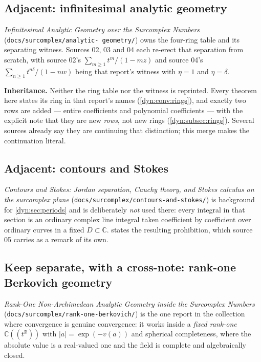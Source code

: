 \documentclass[11pt,letterpaper]{article}
\theoremstyle{definition}
\theoremstyle{remark}
\newcommand{\C}{\mathbb C}
\newcommand{\R}{\mathbb R}
\numberwithin{equation}{section}
\begin{document}
\subsection{Adjacent: infinitesimal analytic geometry}
\emph{Infinitesimal Analytic Geometry over the Surcomplex Numbers}
(\texttt{docs/\allowbreak surcomplex/\allowbreak analytic-\allowbreak
geometry/}) owns the four-ring table and its separating witness. Sources
02, 03 and 04 each re-erect that
separation from scratch, with source 02's $\sum_{m\ge1}t^{m}/(1-mz)$ and
source 04's $\sum_{n\ge1}t^{n\delta}/(1-nw)$ being that report's witness
with $\eta=1$ and $\eta=\delta$.

\textbf{Inheritance.} Neither the ring table nor the witness is
reprinted. Every theorem here states its ring in that report's names
(\cref{dyn:conv:rings}), and exactly two rows are added ---
entire coefficients and polynomial coefficients --- with the explicit note
that they are new \emph{rows}, not new rings
(\cref{dyn:subsec:rings}). Several sources already say they are continuing
that distinction; this merge makes the continuation literal.

\subsection{Adjacent: contours and Stokes}
\emph{Contours and Stokes: Jordan separation, Cauchy theory, and Stokes
calculus on the surcomplex plane}
(\texttt{docs/surcomplex/contours-and-stokes/}) is background for
\cref{dyn:sec:periods} and is deliberately \emph{not} used there: every
integral in that section is an ordinary complex line integral taken
coefficient by coefficient over ordinary curves in a fixed $D\subset\C$.
 states the resulting prohibition, which source 05
carries as a remark of its own.

\subsection{Keep separate, with a cross-note: rank-one Berkovich geometry}
\label{dyn:subsec:berkovich}
\emph{Rank-One Non-Archimedean Analytic Geometry inside the Surcomplex
Numbers}
(\texttt{docs/\allowbreak surcomplex/\allowbreak rank-one-berkovich/}) is
the one report in the collection where convergence is genuine convergence:
it works inside
a \emph{fixed rank-one} $\C((t^{\R}))$ with $|a|=\exp(-v(a))$ and spherical
completeness, where the absolute value is a real-valued one and the field
is complete and algebraically closed.
\end{document}
